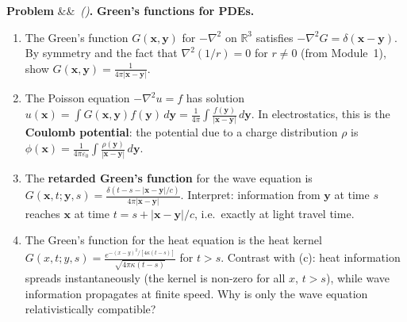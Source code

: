\documentclass[12pt,a4paper]{article}
\newcounter{problem}
\newenvironment{problem}[1][]{\refstepcounter{problem}\par\vspace{6pt}\noindent\textbf{\color{MidBlue}Problem \theproblem}\ifx&#1&\else\ \textit{(#1)}\fi\textbf{.}\enskip}{\par\vspace{4pt}}
\begin{document}
\begin{problem}
\label{prob:greens_pde}
\textbf{Green's functions for PDEs.}
\begin{enumerate}[label=(\alph*),topsep=2pt]
  \item The Green's function $G(\mathbf{x},\mathbf{y})$ for $-\nabla^2$ on $\mathbb{R}^3$ satisfies $-\nabla^2 G = \delta(\mathbf{x}-\mathbf{y})$. By symmetry and the fact that $\nabla^2(1/r)=0$ for $r\neq 0$ (from Module~1), show $G(\mathbf{x},\mathbf{y}) = \frac{1}{4\pi|\mathbf{x}-\mathbf{y}|}$.
  \item The Poisson equation $-\nabla^2 u = f$ has solution $u(\mathbf{x}) = \int G(\mathbf{x},\mathbf{y})f(\mathbf{y})\,d\mathbf{y} = \frac{1}{4\pi}\int\frac{f(\mathbf{y})}{|\mathbf{x}-\mathbf{y}|}\,d\mathbf{y}$. In electrostatics, this is the \textbf{Coulomb potential}: the potential due to a charge distribution $\rho$ is $\phi(\mathbf{x}) = \frac{1}{4\pi\varepsilon_0}\int\frac{\rho(\mathbf{y})}{|\mathbf{x}-\mathbf{y}|}\,d\mathbf{y}$.
  \item The \textbf{retarded Green's function} for the wave equation is $G(\mathbf{x},t;\mathbf{y},s) = \frac{\delta(t-s-|\mathbf{x}-\mathbf{y}|/c)}{4\pi|\mathbf{x}-\mathbf{y}|}$. Interpret: information from $\mathbf{y}$ at time $s$ reaches $\mathbf{x}$ at time $t=s+|\mathbf{x}-\mathbf{y}|/c$, i.e.\ exactly at light travel time.
  \item The Green's function for the heat equation is the heat kernel $G(x,t;y,s) = \frac{e^{-(x-y)^2/[4\kappa(t-s)]}}{\sqrt{4\pi\kappa(t-s)}}$ for $t>s$. Contrast with (c): heat information spreads instantaneously (the kernel is non-zero for all $x$, $t>s$), while wave information propagates at finite speed. Why is only the wave equation relativistically compatible?
\end{enumerate}
\end{problem}
\end{document}
